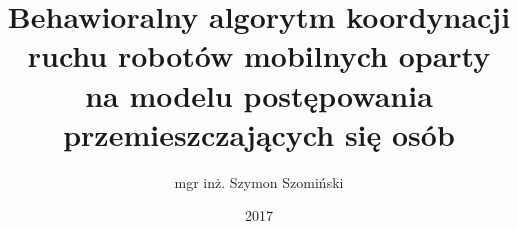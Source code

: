 \documentclass{aghdpl}
\author{mgr inż. Szymon Szomiński}
\title{Behawioralny algorytm koordynacji ruchu robotów mobilnych oparty na modelu postępowania przemieszczających się osób}
\date{2017}
\begin{document}
\titlepages
%
%
%
%
%
%

\tableofcontents

 
















\newpage
\listoffigures
	
\end{document}
